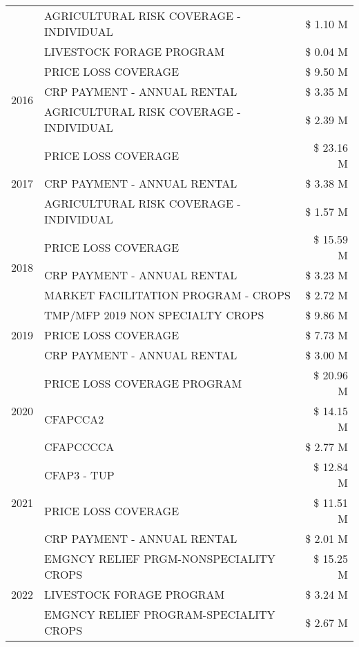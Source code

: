 \begin{tabular}{llr}
 & AGRICULTURAL RISK COVERAGE - INDIVIDUAL & \$ 1.10 M \\
 & LIVESTOCK FORAGE PROGRAM & \$ 0.04 M \\
\cline{1-3}
\multirow[t]{3}{*}{2016} & PRICE LOSS COVERAGE & \$ 9.50 M \\
 & CRP PAYMENT - ANNUAL RENTAL & \$ 3.35 M \\
 & AGRICULTURAL RISK COVERAGE - INDIVIDUAL & \$ 2.39 M \\
\cline{1-3}
\multirow[t]{3}{*}{2017} & PRICE LOSS COVERAGE & \$ 23.16 M \\
 & CRP PAYMENT - ANNUAL RENTAL & \$ 3.38 M \\
 & AGRICULTURAL RISK COVERAGE - INDIVIDUAL & \$ 1.57 M \\
\cline{1-3}
\multirow[t]{3}{*}{2018} & PRICE LOSS COVERAGE & \$ 15.59 M \\
 & CRP PAYMENT - ANNUAL RENTAL & \$ 3.23 M \\
 & MARKET FACILITATION PROGRAM - CROPS & \$ 2.72 M \\
\cline{1-3}
\multirow[t]{3}{*}{2019} & TMP/MFP 2019 NON SPECIALTY CROPS & \$ 9.86 M \\
 & PRICE LOSS COVERAGE & \$ 7.73 M \\
 & CRP PAYMENT - ANNUAL RENTAL & \$ 3.00 M \\
\cline{1-3}
\multirow[t]{3}{*}{2020} & PRICE LOSS COVERAGE PROGRAM & \$ 20.96 M \\
 & CFAPCCA2 & \$ 14.15 M \\
 & CFAPCCCCA & \$ 2.77 M \\
\cline{1-3}
\multirow[t]{3}{*}{2021} & CFAP3 - TUP & \$ 12.84 M \\
 & PRICE LOSS COVERAGE & \$ 11.51 M \\
 & CRP PAYMENT - ANNUAL RENTAL & \$ 2.01 M \\
\cline{1-3}
\multirow[t]{3}{*}{2022} & EMGNCY RELIEF PRGM-NONSPECIALITY CROPS & \$ 15.25 M \\
 & LIVESTOCK FORAGE PROGRAM & \$ 3.24 M \\
 & EMGNCY RELIEF PROGRAM-SPECIALITY CROPS & \$ 2.67 M \\
\cline{1-3}
\bottomrule
\end{tabular}
